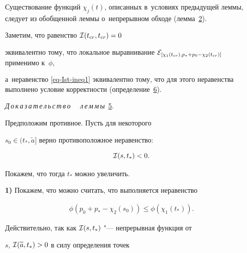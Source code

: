 \smallskip



\begin{remark}[3] Существование функций $\chi_j(t)$, описанных в~условиях предыдущей леммы, следует из обобщенной леммы о~непрерывном обходе (лемма~\hyperlink{palin:lemma2}{2}).

\end{remark}



\vspace{-3mm}



\begin{remark}[4] Заметим, что равенство ${\cal I}(t_{cr},t_{cr})=0$

эквивалентно тому, что локальное выравнивание ${\cal E}_{[\chi_1(t_{cr}),p_*+p_0-\chi_2(t_{cr})]}$ применимо к~$\phi$,

а~неравенство \eqref{eq-Ist-ineq1} эквивалентно тому, что для этого неравенства выполнено условие корректности (определение~\hyperlink{palin:definition6}{6}).

\end{remark}



\smallskip



{\it Д\,о\,к\,а\,з\,а\,т\,е\,л\,ь\,с\,т\,в\,о \ \ л\,е\,м\,м\,ы\/}~\hyperlink{palin:lemma5}{5}.

Предположим противное. Пусть для некоторого

$s_0\in(t_*,\widetilde{a}]$ верно противоположное неравенство:

$${\cal I}(s,t_*)<0.$$ 

Покажем, что тогда $t_*$ можно увеличить.



{\bf 1)} Покажем, что можно считать, что выполняется неравенство

\begin{gather}

\phi(p_0+p_*-\chi_2(s_0))\le\phi(\chi_1(t_*)).

\label{eq-SupportiveForProof-leftmove-1}

\end{gather}



Действительно, так как ${\cal I}(s,t_*)$ "--- непрерывная функция от

$s$, ${\cal I}(\widetilde{a},t_*)>0$ в силу определения точек

